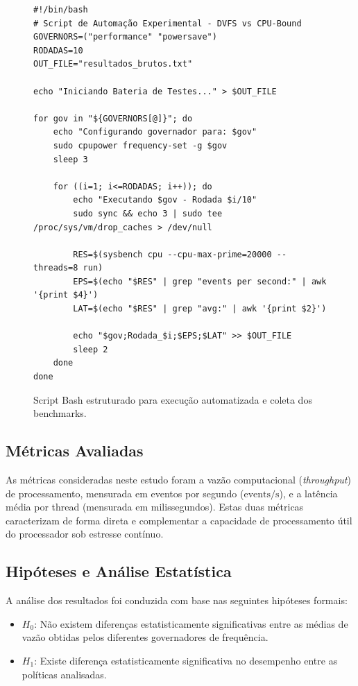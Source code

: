 \documentclass[12pt]{article}
\begin{document}
\begin{figure}[ht]
\begin{minipage}{\textwidth}
\begin{verbatim}
#!/bin/bash
# Script de Automação Experimental - DVFS vs CPU-Bound
GOVERNORS=("performance" "powersave")
RODADAS=10
OUT_FILE="resultados_brutos.txt"

echo "Iniciando Bateria de Testes..." > $OUT_FILE

for gov in "${GOVERNORS[@]}"; do
    echo "Configurando governador para: $gov"
    sudo cpupower frequency-set -g $gov
    sleep 3
    
    for ((i=1; i<=RODADAS; i++)); do
        echo "Executando $gov - Rodada $i/10"
        sudo sync && echo 3 | sudo tee /proc/sys/vm/drop_caches > /dev/null
        
        RES=$(sysbench cpu --cpu-max-prime=20000 --threads=8 run)
        EPS=$(echo "$RES" | grep "events per second:" | awk '{print $4}')
        LAT=$(echo "$RES" | grep "avg:" | awk '{print $2}')
        
        echo "$gov;Rodada_$i;$EPS;$LAT" >> $OUT_FILE
        sleep 2
    done
done
\end{verbatim}
\caption{Script Bash estruturado para execução automatizada e coleta dos benchmarks.}
\label{code:script_coleta}
\end{minipage}
\end{figure}

\subsection{Métricas Avaliadas}

As métricas consideradas neste estudo foram a vazão computacional (\textit{throughput}) de processamento, mensurada em eventos por segundo ($\text{events/s}$), e a latência média por thread (mensurada em milissegundos). Estas duas métricas caracterizam de forma direta e complementar a capacidade de processamento útil do processador sob estresse contínuo.

\subsection{Hipóteses e Análise Estatística}

A análise dos resultados foi conduzida com base nas seguintes hipóteses formais:
\begin{itemize}
\item $H_0$: Não existem diferenças estatisticamente significativas entre as médias de vazão obtidas pelos diferentes governadores de frequência.
\item $H_1$: Existe diferença estatisticamente significativa no desempenho entre as políticas analisadas.
\end{itemize}
\end{document}
